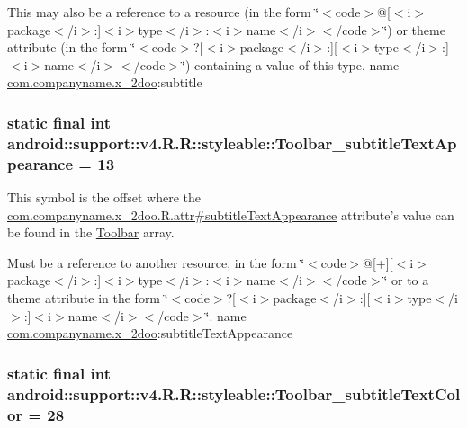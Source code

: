 This may also be a reference to a resource (in the form \char`\"{}$<$code$>$@\mbox{[}$<$i$>$package$<$/i$>$:\mbox{]}$<$i$>$type$<$/i$>$:$<$i$>$name$<$/i$>$$<$/code$>$\char`\"{}) or theme attribute (in the form \char`\"{}$<$code$>$?\mbox{[}$<$i$>$package$<$/i$>$:\mbox{]}\mbox{[}$<$i$>$type$<$/i$>$:\mbox{]}$<$i$>$name$<$/i$>$$<$/code$>$\char`\"{}) containing a value of this type.  name \hyperlink{namespacecom_1_1companyname_1_1x__2doo}{com.companyname.x\_\-2doo}:subtitle \hypertarget{classandroid_1_1support_1_1v4_1_1_r_1_1styleable_591a12ae0a18148eb5e6102631e7a595}{
\subsubsection[{Toolbar\_\-subtitleTextAppearance}]{\setlength{\rightskip}{0pt plus 5cm}static final int android::support::v4.R.R::styleable::Toolbar\_\-subtitleTextAppearance = 13}}
\label{classandroid_1_1support_1_1v4_1_1_r_1_1styleable_591a12ae0a18148eb5e6102631e7a595}


This symbol is the offset where the \hyperlink{classcom_1_1companyname_1_1x__2doo_1_1_r_1_1attr_1d6b31814d297da4d7d18412e2d6fc15}{com.companyname.x\_\-2doo.R.attr\#subtitleTextAppearance} attribute's value can be found in the \hyperlink{classandroid_1_1support_1_1v4_1_1_r_1_1styleable_0646d71cfbd4a8645c7d805b33e1c574}{Toolbar} array.

Must be a reference to another resource, in the form \char`\"{}$<$code$>$@\mbox{[}+\mbox{]}\mbox{[}$<$i$>$package$<$/i$>$:\mbox{]}$<$i$>$type$<$/i$>$:$<$i$>$name$<$/i$>$$<$/code$>$\char`\"{} or to a theme attribute in the form \char`\"{}$<$code$>$?\mbox{[}$<$i$>$package$<$/i$>$:\mbox{]}\mbox{[}$<$i$>$type$<$/i$>$:\mbox{]}$<$i$>$name$<$/i$>$$<$/code$>$\char`\"{}.  name \hyperlink{namespacecom_1_1companyname_1_1x__2doo}{com.companyname.x\_\-2doo}:subtitleTextAppearance \hypertarget{classandroid_1_1support_1_1v4_1_1_r_1_1styleable_6aafb77e85baad2d0ed9e1879c82cf10}{
\subsubsection[{Toolbar\_\-subtitleTextColor}]{\setlength{\rightskip}{0pt plus 5cm}static final int android::support::v4.R.R::styleable::Toolbar\_\-subtitleTextColor = 28}}
\label{classandroid_1_1support_1_1v4_1_1_r_1_1styleable_6aafb77e85baad2d0ed9e1879c82cf10}


